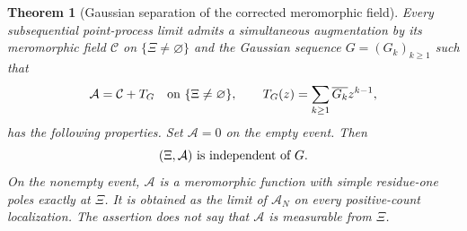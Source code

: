 \documentclass[11pt,a4paper]{article}
\numberwithin{equation}{section}
\newtheorem{theorem}{Theorem}[section]
\theoremstyle{definition}
\theoremstyle{remark}
\begin{document}
\begin{theorem}[Gaussian separation of the corrected meromorphic field]
\label{thm:corrected-field-gaussian-independence}
Every subsequential point-process limit admits a simultaneous
augmentation by its meromorphic field $\mathcal C$ on
$\{\Xi\ne\varnothing\}$ and the Gaussian sequence $G=(G_k)_{k\ge1}$
such that
\[
 \mathcal A=\mathcal C+T_G
       \quad\hbox{on }\{\Xi\ne\varnothing\},\qquad
 T_G(z)=\sum_{k\ge1}\overline{G_k}z^{k-1},
\]
has the following properties. Set $\mathcal A=0$ on the empty event.
Then
\begin{equation}\label{eq:corrected-field-gaussian-independence}
             (\Xi,\mathcal A)\ \hbox{is independent of }G.
\end{equation}
On the nonempty event, $\mathcal A$ is a meromorphic function with
simple residue-one poles exactly at $\Xi$. It is obtained as the
limit of $\mathcal A_N$ on every positive-count localization.
The assertion does not say that $\mathcal A$ is measurable from $\Xi$.
\end{theorem}
\end{document}
